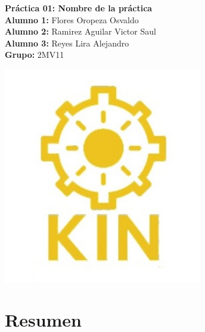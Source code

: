 \documentclass[12pt,a4paper]{article}
\begin{document}
\noindent
{}

\vspace{5mm}

\noindent
\begin{minipage}{0.6\textwidth}
    \raggedright%
    \textbf{Práctica 01: Nombre de la práctica}\\[2mm]
    \textbf{Alumno 1:} Flores Oropeza Osvaldo\\
    \textbf{Alumno 2:} Ramirez Aguilar Victor Saul\\
    \textbf{Alumno 3:} Reyes Lira Alejandro\\
    \textbf{Grupo:} 2MV11
\end{minipage}%
\hfill
\begin{minipage}{0.35\textwidth}
    \raggedleft%
    \includegraphics[width=0.65\textwidth]{logos/logo_Kin.jpeg}
\end{minipage}

\vspace{10mm}



\section{Resumen}

\end{document}
